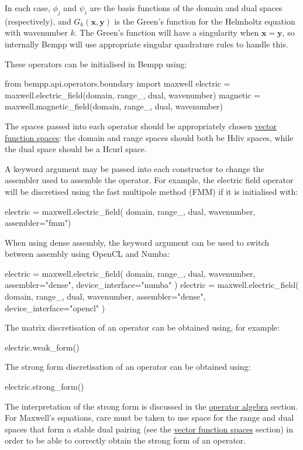 \documentclass[a4paper]{book}
\begin{document}
In each case,  $\phi_j$ and $\psi_i$ are the basis functions of the domain and dual spaces (respectively),
and $G_k(\mathbf{x},\mathbf{y})$ is the Green's function for the Helmholtz equation with
wavenumber $k$.
The Green's function will have a singularity when $\mathbf{x}=\mathbf{y}$, so internally Bempp will
use appropriate singular quadrature rules to handle this.

These operators can be initialised in Bempp using:
\begin{python}
from bempp.api.operators.boundary import maxwell
electric = maxwell.electric_field(domain, range_, dual, wavenumber)
magnetic = maxwell.magnetic_field(domain, range_, dual, wavenumber)
\end{python}
The spaces passed into each operator should be appropriately chosen
\href{vector_function_spaces.md}{vector function spaces}: the domain and range spaces
should both be Hdiv spaces, while the dual space should be a Hcurl space.

A keyword argument  may be passed into each constructor to change the assembler
used to assemble the operator. For example, the electric field operator will be discretised using
the fast multipole method (FMM) if it is initialised with:
\begin{python}
electric = maxwell.electric_field(
    domain, range_, dual, wavenumber, assembler="fmm")
\end{python}

When using dense assembly, the keyword argument  can be used to switch
between assembly using OpenCL and Numba:
\begin{python}
electric = maxwell.electric_field(
    domain, range_, dual, wavenumber, assembler="dense",
    device_interface="numba"
    )
electric = maxwell.electric_field(
    domain, range_, dual, wavenumber, assembler="dense",
    device_interface="opencl"
    )
\end{python}

The matrix discretisation of an operator can be obtained using, for example:

\begin{python}
electric.weak_form()
\end{python}

The strong form discretisation of an operator can be obtained using:
\begin{python}
electric.strong_form()
\end{python}
The interpretation of the strong form is discussed in the \href{operator_algebra.md}{operator algebra}
section. For Maxwell's equations, care must be taken to use space for the range and dual spaces
that form a stable dual pairing (see the \href{vector_function_spaces.md}{vector function spaces}
section) in order to be able to correctly obtain the strong form of an operator.
\end{document}
